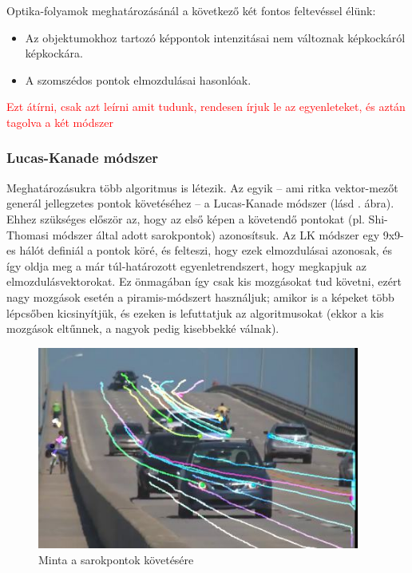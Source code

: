 Optika-folyamok meghatározásánál a következő két fontos feltevéssel élünk:
\begin{itemize}
\item Az objektumokhoz tartozó képpontok intenzitásai nem változnak képkockáról képkockára.
\item A szomszédos pontok elmozdulásai hasonlóak.
\end{itemize}

\textcolor{red}{Ezt átírni, csak azt leírni amit tudunk, rendesen írjuk le az egyenleteket, és aztán tagolva a két módszer}

\subsubsection{Lucas-Kanade módszer}

Meghatározásukra több algoritmus is létezik. Az egyik -- ami ritka vektor-mezőt generál jellegzetes pontok követéséhez -- a Lucas-Kanade \cite{LK} módszer (lásd . ábra). Ehhez szükséges először az, hogy az első képen a követendő pontokat (pl. Shi-Thomasi \cite{shi-thomasi} módszer által adott sarokpontok) azonosítsuk. Az LK módszer egy 9x9-es hálót definiál a pontok köré, és felteszi, hogy ezek elmozdulásai azonosak, és így oldja meg a már túl-határozott egyenletrendszert, hogy megkapjuk az elmozdulásvektorokat. Ez önmagában így csak kis mozgásokat tud követni, ezért nagy mozgások esetén a piramis-módszert használjuk; amikor is a képeket több lépcsőben kicsinyítjük, és ezeken is lefuttatjuk az algoritmusokat (ekkor a kis mozgások eltűnnek, a nagyok pedig kisebbekké válnak).

\begin{figure}[tbh]
\centering
\includegraphics[width=300pt]{figures/opticalflow_lk.jpg}
\caption{Minta a sarokpontok követésére \cite{opencv-lk} \label{fig:lk}}
\end{figure}

